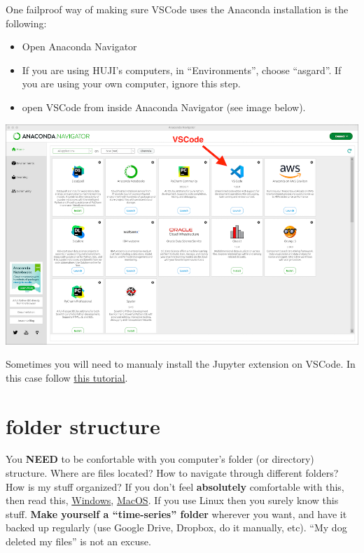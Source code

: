 \documentclass[
  letterpaper,
  DIV=11,
  numbers=noendperiod]{scrreprt}
\providecommand{\tightlist}{%
  \setlength{\itemsep}{0pt}\setlength{\parskip}{0pt}}\usepackage{longtable,booktabs,array}
\begin{document}
One failproof way of making sure VSCode uses the Anaconda installation
is the following:

\begin{itemize}
\tightlist
\item
  Open Anaconda Navigator
\item
  If you are using HUJI's computers, in ``Environments'', choose
  ``asgard''. If you are using your own computer, ignore this step.
\item
  open VSCode from inside Anaconda Navigator (see image below).
\end{itemize}

\includegraphics{basics/./anacondanavigator.png}

Sometimes you will need to manualy install the Jupyter extension on
VSCode. In this case follow
\href{https://code.visualstudio.com/docs/datascience/jupyter-notebooks}{this
tutorial}.

\section{folder structure}\label{folder-structure}

You \textbf{NEED} to be confortable with you computer's folder (or
directory) structure. Where are files located? How to navigate through
different folders? How is my stuff organized? If you don't feel
\textbf{absolutely} comfortable with this, then read this,
\href{http://www2.westsussex.gov.uk/LearningandDevelopment/IT\%20Learning\%20Guides/Microsoft\%20Windows\%207/05\%20Working\%20with\%20folders.pdf}{Windows},
\href{https://recoverit.wondershare.com/mac-tips/mac-finder-tutorial-mac.html}{MacOS}.
If you use Linux then you surely know this stuff. \textbf{Make yourself
a ``time-series'' folder} wherever you want, and have it backed up
regularly (use Google Drive, Dropbox, do it manually, etc). ``My dog
deleted my files'' is not an excuse.
\end{document}
